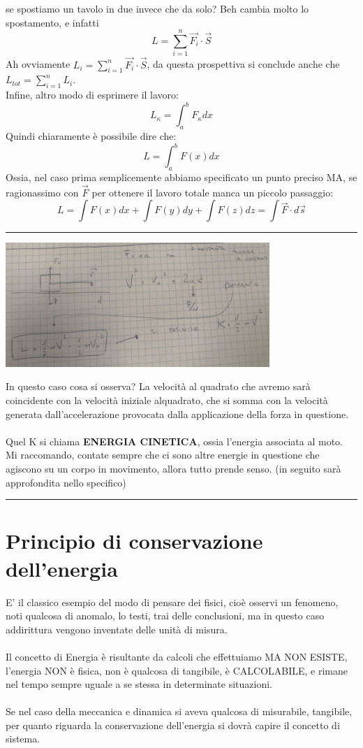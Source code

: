 \documentclass[12pt, a4paper, openany, oneside]{book}
\begin{document}
se spostiamo un tavolo in due invece che da solo? Beh cambia molto lo 
spostamento, e infatti \[L = \sum_{i=1}^{n} \overrightarrow{F_{i}} \cdot \overrightarrow{S}\]
Ah ovviamente $L_{i} = \sum_{i=1}^{n} \overrightarrow{F_{i}} \cdot \overrightarrow{S}$,
da questa prospettiva si conclude anche che $L_{tot} = \sum_{i=1}^{n} L_{i}$.
\\ 
Infine, altro modo di esprimere il lavoro:
\[L_{\kappa} = \int_{a}^{b} F_{\kappa}dx  \]
Quindi chiaramente è possibile dire che:
\[L = \int_{a}^{b} F(x) dx\]
Ossia, nel caso prima semplicemente abbiamo specificato un punto preciso MA,
se ragionassimo con $\overrightarrow{F}$ per ottenere il lavoro totale manca un
piccolo passaggio:
\[L = \int F(x) dx + \int F(y) dy + \int F(z) dz = \int \overrightarrow{F}\cdot 
d \overrightarrow{s}\]
{\color{black} \rule{\linewidth}{0.3mm} }
\begin{center}
\includegraphics[width=0.75\textwidth]{velocitalavoro}
\end{center}
In questo caso cosa si osserva? La velocità al quadrato che avremo sarà coincidente
con la velocità iniziale alquadrato, che si somma con la velocità generata
dall'accelerazione provocata dalla applicazione della forza in questione.\\ \\
Quel K si chiama \textbf{ENERGIA CINETICA}, ossia l'energia associata al moto. Mi raccomando,
contate sempre che ci sono altre energie in questione che agiscono su un corpo
in movimento, allora tutto prende senso. (in seguito sarà approfondita nello
specifico)
\\
{\color{black} \rule{\linewidth}{0.3mm} }
\chapter{Principio di conservazione dell'energia}
E' il classico esempio del modo di pensare dei fisici, cioè osservi un fenomeno,
noti qualcosa di anomalo, lo testi, trai delle conclusioni, ma in questo caso
addirittura vengono inventate delle unità di misura.
\\ \\
Il concetto di Energia è risultante da calcoli che effettuiamo MA NON ESISTE, 
l'energia NON è fisica, non è qualcosa di tangibile, è CALCOLABILE, e rimane
nel tempo sempre uguale a se stessa in determinate situazioni. \\ \\
Se nel caso della meccanica e dinamica si aveva qualcosa di misurabile, tangibile,
per quanto riguarda la conservazione dell'energia si dovrà capire il concetto di
sistema.
\end{document}
